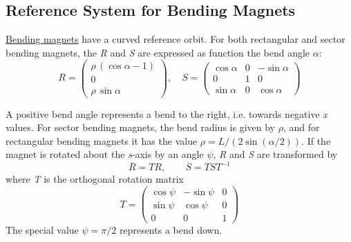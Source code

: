 \subsection{Reference System for Bending Magnets}
\label{subsec:local_rbend}
\hyperref[sec:bend]{Bending magnets} have a curved reference orbit. 
For both rectangular and sector bending magnets, the \textit{R} and
\textit{S} are expressed as function the bend angle $\alpha$: 
\begin{equation}
R =
 \begin{pmatrix}
  \rho\,(\cos \alpha - 1) \\
  0 \\
  \rho\,\sin \alpha
 \end{pmatrix}
, \quad
S =
 \begin{pmatrix}
  \cos \alpha & 0 &  -\sin \alpha \\
  0 & 1 &  0 \\
  \sin \alpha & 0 &  \cos \alpha
 \end{pmatrix}
\end{equation}
 
A positive bend angle represents a bend to the right, i.e. towards
negative \textit{x} values. 
For sector bending magnets, the bend radius is given by $\rho$, and for
rectangular bending magnets it has the value $\rho = L / (2 \sin(\alpha/2))$. 
If the magnet is rotated about the \textit{s}-axis by an angle $\psi$,
\textit{R} and \textit{S} are transformed by  
\begin{equation}
   \overline{R}=TR,
   \qquad
   \overline{S}=TST^{-1}
\end{equation}
where \textit{T} is the orthogonal rotation matrix 
\begin{equation}
T =
 \begin{pmatrix}
  \cos \psi &  -\sin \psi & 0 \\
  \sin \psi &  \cos \psi  & 0 \\
  0	    &	0	  & 1 
 \end{pmatrix}
\end{equation}
The special value $\psi = \pi/2$ represents a bend down.  


